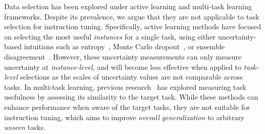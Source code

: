 Data selection has been explored under active learning and multi-task learning frameworks. Despite its prevalence, we argue that they are not applicable to task selection for instruction tuning.
Specifically, active learning methods have focused on selecting the most useful \textit{instances} for a single task, using either uncertainty-based intuitions such as entropy~\cite{settles2009active}, Monte Carlo dropout~\cite{gal2016dropout}, or ensemble disagreement~\cite{houlsby2011bayesian, siddhant-lipton-2018-deep}. However, these uncertainty measurements can only measure uncertainty at \textit{instance-level}, 
and will become less effective when applied to \textit{task-level} selections as the scales of uncertainty values are not comparable across tasks.
In multi-task learning, previous research~\cite{ivison2022data, poth2021pre, kung2021efficient} has explored measuring task usefulness by assessing its similarity to the target task. While these methods can enhance performance when aware of the target tasks, they are not suitable for instruction tuning, which aims to improve \textit{overall generalization} to arbitrary \textit{unseen} tasks. 
